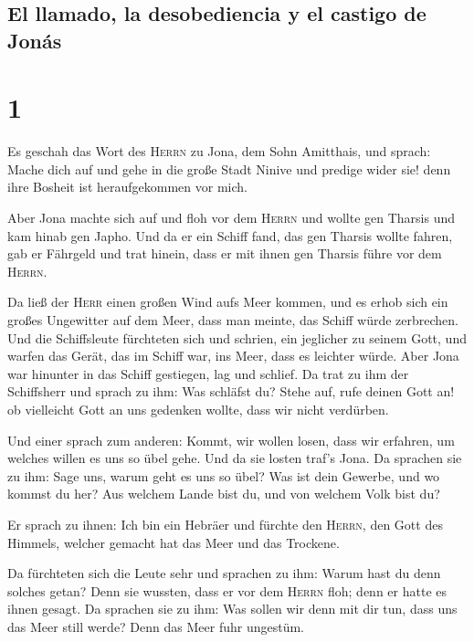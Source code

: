 \hypertarget{el-llamado-la-desobediencia-y-el-castigo-de-jonuxe1s}{%
\subsection{El llamado, la desobediencia y el castigo de
Jonás}\label{el-llamado-la-desobediencia-y-el-castigo-de-jonuxe1s}}

\hypertarget{section}{%
\section{1}\label{section}}

 Es geschah das Wort des \textsc{Herrn} zu Jona, dem Sohn
Amitthais, und sprach:  Mache dich auf und gehe in die
große Stadt Ninive und predige wider sie! denn ihre Bosheit ist
heraufgekommen vor mich.

 Aber Jona machte sich auf und floh vor dem \textsc{Herrn}
und wollte gen Tharsis und kam hinab gen Japho. Und da er ein Schiff
fand, das gen Tharsis wollte fahren, gab er Fährgeld und trat hinein,
dass er mit ihnen gen Tharsis führe vor dem \textsc{Herrn}.

 Da ließ der \textsc{Herr} einen großen Wind aufs Meer
kommen, und es erhob sich ein großes Ungewitter auf dem Meer, dass man
meinte, das Schiff würde zerbrechen.  Und die Schiffsleute
fürchteten sich und schrien, ein jeglicher zu seinem Gott, und warfen
das Gerät, das im Schiff war, ins Meer, dass es leichter würde. Aber
Jona war hinunter in das Schiff gestiegen, lag und schlief.
 Da trat zu ihm der Schiffsherr und sprach zu ihm: Was
schläfst du? Stehe auf, rufe deinen Gott an! ob vielleicht Gott an uns
gedenken wollte, dass wir nicht verdürben.

 Und einer sprach zum anderen: Kommt, wir wollen losen,
dass wir erfahren, um welches willen es uns so übel gehe. Und da sie
losten traf's Jona.  Da sprachen sie zu ihm: Sage uns,
warum geht es uns so übel? Was ist dein Gewerbe, und wo kommst du her?
Aus welchem Lande bist du, und von welchem Volk bist du?

 Er sprach zu ihnen: Ich bin ein Hebräer und fürchte den
\textsc{Herrn}, den Gott des Himmels, welcher gemacht hat das Meer und
das Trockene.

 Da fürchteten sich die Leute sehr und sprachen zu ihm:
Warum hast du denn solches getan? Denn sie wussten, dass er vor dem
\textsc{Herrn} floh; denn er hatte es ihnen gesagt.  Da
sprachen sie zu ihm: Was sollen wir denn mit dir tun, dass uns das Meer
still werde? Denn das Meer fuhr ungestüm.

